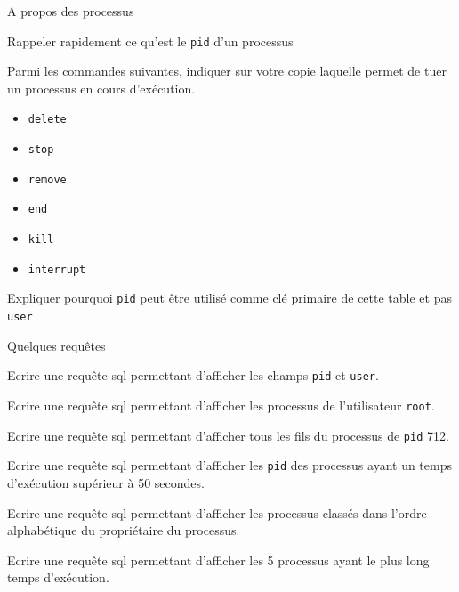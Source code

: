 \documentclass[11pt,a4paper]{article}
\begin{document}
\QListe
\item A propos des processus
\SQListe
\item Rappeler rapidement ce qu'est le {\tt pid} d'un processus
\item Parmi les commandes suivantes, indiquer sur votre copie laquelle permet de tuer un processus en cours d'exécution.
    \begin{itemize}
        \item {\tt delete}
        \item {\tt stop}
        \item {\tt remove}
        \item {\tt end}
        \item {\tt kill}
        \item {\tt interrupt}
    \end{itemize}
\item Expliquer pourquoi {\tt pid} peut être utilisé comme clé primaire de cette table et pas {\tt user}
\FinListe
\item Quelques requêtes
\SQListe
\item Ecrire une requête {\sc sql} permettant d'afficher les champs {\tt pid} et {\tt user}.
\item Ecrire une requête {\sc sql} permettant d'afficher les processus de l'utilisateur {\tt root}.
\item Ecrire une requête {\sc sql} permettant d'afficher tous les fils du processus de {\tt pid} 712.
\item Ecrire une requête {\sc sql} permettant d'afficher les {\tt pid} des processus ayant un temps d'exécution supérieur à 50 secondes.
\item Ecrire une requête {\sc sql} permettant d'afficher les processus classés dans l'ordre alphabétique du propriétaire du processus.
\item Ecrire une requête {\sc sql} permettant d'afficher les 5 processus ayant le plus long temps d'exécution.
\FinListe
\FinListe
\end{document}

